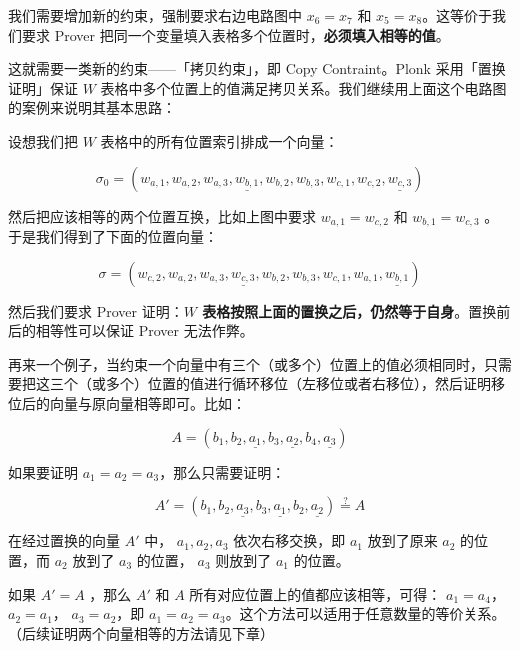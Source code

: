 
我们需要增加新的约束，强制要求右边电路图中 \(x_6=x_7\) 和
\(x_5=x_8\)。这等价于我们要求 Prover
把同一个变量填入表格多个位置时，\textbf{必须填入相等的值}。

这就需要一类新的约束------「拷贝约束」，即 Copy Contraint。Plonk
采用「置换证明」保证 \(W\)
表格中多个位置上的值满足拷贝关系。我们继续用上面这个电路图的案例来说明其基本思路：

设想我们把 \(W\) 表格中的所有位置索引排成一个向量：

\[
\sigma_0=(\boxed{w_{a,1}}, w_{a,2}, w_{a,3}, \underline{w_{b,1}}, w_{b,2}, w_{b,3}, w_{c,1}, \boxed{w_{c,2}}, \underline{w_{c,3}})
\]

然后把应该相等的两个位置互换，比如上图中要求 \(w_{a,1}=w_{c,2}\) 和
\(w_{b,1}=w_{c,3}\) 。于是我们得到了下面的位置向量：

\[
\sigma=(\boxed{w_{c,2}}, w_{a,2}, w_{a,3}, \underline{w_{c,3}}, w_{b,2}, w_{b,3}, w_{c,1}, \boxed{w_{a,1}}, \underline{w_{b,1}})
\]

然后我们要求 Prover 证明：\textbf{\(W\)
表格按照上面的置换之后，仍然等于自身}。置换前后的相等性可以保证 Prover
无法作弊。

再来一个例子，当约束一个向量中有三个（或多个）位置上的值必须相同时，只需要把这三个（或多个）位置的值进行循环移位（左移位或者右移位），然后证明移位后的向量与原向量相等即可。比如：

\[
A = (b_1, b_2, \underline{a_1}, b_3, \underline{a_2}, b_4, \underline{a_3})
\]

如果要证明 \(a_1=a_2=a_3\)，那么只需要证明：

\[
A' =  (b_1, b_2, \underline{a_3}, b_3, \underline{a_1}, b_2, \underline{a_2}) \overset{?}{=} A
\]

在经过置换的向量 \(A'\) 中， \(a_1, a_2, a_3\) 依次右移交换，即 \(a_1\)
放到了原来 \(a_2\) 的位置，而 \(a_2\) 放到了 \(a_3\) 的位置， \(a_3\)
则放到了 \(a_1\) 的位置。

如果 \(A'=A\) ，那么 \(A'\) 和 \(A\)
所有对应位置上的值都应该相等，可得： \(a_1=a_4\)， \(a_2=a_1\)，
\(a_3=a_2\)，即
\(a_1=a_2=a_3\)。这个方法可以适用于任意数量的等价关系。（后续证明两个向量相等的方法请见下章）

